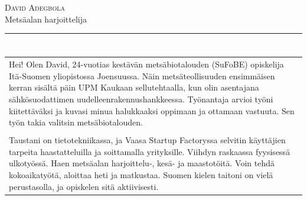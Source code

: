 \documentclass[a4paper,11pt]{article}
\begin{document}
\small
\setlength{\cvlabelw}{3.9cm}
\titlespacing{\section}{0pt}{0.55em}{2pt}

\begin{cvheader}
\par{\centering
		{\Huge \textsc{David Adegbola}}\\[0.4em]
		{\Large Metsäalan harjoittelija}
	\bigskip\par}

\hrule
\vspace{0.5em}
\end{cvheader}

\section{}
\begin{tabular}{p{}}
 Hei! Olen David, 24-vuotias kestävän metsäbiotalouden (SuFoBE) opiskelija Itä-Suomen yliopistossa Joensuussa. Näin metsäteollisuuden ensimmäisen kerran sisältä päin UPM Kaukaan sellutehtaalla, kun olin asentajana sähkösuodattimen uudelleenrakennushankkeessa. Työnantaja arvioi työni kiitettäväksi ja kuvasi minua halukkaaksi oppimaan ja ottamaan vastuuta. Sen työn takia valitsin metsäbiotalouden.\\\\

 Taustani on tietotekniikassa, ja Vaasa Startup Factoryssa selvitin käyttäjien tarpeita haastatteluilla ja soittamalla yrityksille. Viihdyn raskaassa fyysisessä ulkotyössä. Haen metsäalan harjoittelu-, kesä- ja maastotöitä. Voin tehdä kokoaikatyötä, aloittaa heti ja matkustaa. Suomen kielen taitoni on vielä perustasolla, ja opiskelen sitä aktiivisesti.
\end{tabular}

\section{}
\end{document}
